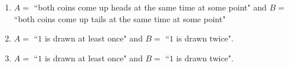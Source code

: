 \documentclass[11pt]{article}
\begin{document}
\begin{enumerate}
\begin{enumerate}
\item $A =$ ``both coins come up heads at the same time at some point" 
and $B = $ ``both coins come up tails at the same time at some point"

\item $A =$ ``$1$ is drawn at least once" and $B = $ ``$1$ is drawn twice".

\item $A =$ ``$1$ is drawn at least once" and $B = $ ``$1$ is drawn twice".

\end{enumerate}

\end{enumerate}










\begin{appendix}
\end{appendix}
\end{document}
